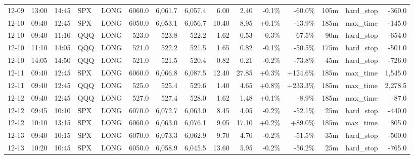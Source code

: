 \documentclass[11pt,a4paper,twoside]{article}
\begin{document}
\begin{landscape}
\begin{center}
\begin{longtable}{>{\color{txtmain}}l l l l l r r r r r r r r >{\color{txtmain}}l r}
12-09 & 13:00 & 14:45 & SPX & LONG & 6060.0 & 6,061.7 & 6,057.4 & 6.00 & 2.40 & \textcolor{lossred}{-0.1\%} & \textcolor{lossred}{-60.0\%} & 105m & hard\_stop & \textcolor{lossred}{-360.0} \\
12-10 & 09:40 & 12:45 & SPX & LONG & 6050.0 & 6,053.1 & 6,056.7 & 10.40 & 8.95 & \textcolor{wingreen}{+0.1\%} & \textcolor{lossred}{-13.9\%} & 185m & max\_time & \textcolor{lossred}{-145.0} \\
12-10 & 09:40 & 11:10 & QQQ & LONG & 523.0 & 523.8 & 522.2 & 1.62 & 0.53 & \textcolor{lossred}{-0.3\%} & \textcolor{lossred}{-67.5\%} & 90m & hard\_stop & \textcolor{lossred}{-654.0} \\
12-10 & 11:10 & 14:05 & QQQ & LONG & 521.0 & 522.2 & 521.5 & 1.65 & 0.82 & \textcolor{lossred}{-0.1\%} & \textcolor{lossred}{-50.5\%} & 175m & hard\_stop & \textcolor{lossred}{-501.0} \\
12-10 & 14:05 & 14:50 & QQQ & LONG & 521.0 & 521.5 & 520.4 & 0.82 & 0.21 & \textcolor{lossred}{-0.2\%} & \textcolor{lossred}{-73.8\%} & 45m & hard\_stop & \textcolor{lossred}{-726.0} \\
12-11 & 09:40 & 12:45 & SPX & LONG & 6060.0 & 6,066.8 & 6,087.5 & 12.40 & 27.85 & \textcolor{wingreen}{+0.3\%} & \textcolor{wingreen}{+124.6\%} & 185m & max\_time & \textcolor{wingreen}{1,545.0} \\
12-11 & 09:40 & 12:45 & QQQ & LONG & 525.0 & 525.4 & 529.6 & 1.40 & 4.65 & \textcolor{wingreen}{+0.8\%} & \textcolor{wingreen}{+233.3\%} & 185m & max\_time & \textcolor{wingreen}{2,278.5} \\
12-12 & 09:40 & 12:45 & QQQ & LONG & 527.0 & 527.4 & 528.0 & 1.62 & 1.48 & \textcolor{wingreen}{+0.1\%} & \textcolor{lossred}{-8.9\%} & 185m & max\_time & \textcolor{lossred}{-87.0} \\
12-12 & 09:45 & 10:10 & SPX & LONG & 6070.0 & 6,072.7 & 6,063.0 & 8.45 & 4.05 & \textcolor{lossred}{-0.2\%} & \textcolor{lossred}{-52.1\%} & 25m & hard\_stop & \textcolor{lossred}{-440.0} \\
12-12 & 10:10 & 13:15 & SPX & LONG & 6060.0 & 6,063.0 & 6,076.1 & 9.05 & 17.10 & \textcolor{wingreen}{+0.2\%} & \textcolor{wingreen}{+89.0\%} & 185m & max\_time & \textcolor{wingreen}{805.0} \\
12-13 & 09:40 & 10:15 & SPX & LONG & 6070.0 & 6,073.3 & 6,062.9 & 9.70 & 4.70 & \textcolor{lossred}{-0.2\%} & \textcolor{lossred}{-51.5\%} & 35m & hard\_stop & \textcolor{lossred}{-500.0} \\
12-13 & 10:20 & 10:45 & SPX & LONG & 6050.0 & 6,058.9 & 6,045.5 & 13.60 & 5.95 & \textcolor{lossred}{-0.2\%} & \textcolor{lossred}{-56.2\%} & 25m & hard\_stop & \textcolor{lossred}{-765.0} \\

\end{longtable}
\end{center}
\end{landscape}
\end{document}
